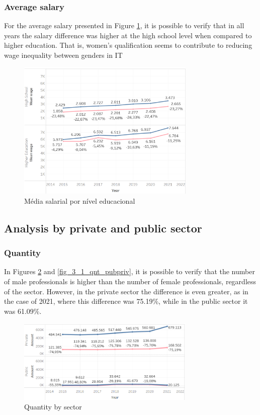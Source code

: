 \subsubsection{Average salary}

For the average salary presented in Figure \ref{fig_2_sal_educ}, it is possible to verify that in all years the salary difference was higher at the high school level when compared to higher education. That is, women’s qualification seems to contribute to reducing wage inequality between genders in IT

\begin{figure}[htbp]
	\centerline{
		\includegraphics[width=85mm]{assets/2_sal_educ.PNG}
	}
	\caption{Média salarial por nível educacional}
	\label{fig_2_sal_educ}
\end{figure}

\subsection{Analysis by private and public sector}  \label{sub:privpub}

\subsubsection{Quantity}

In Figures \ref{fig_3_qnt_pubpriv} and \ref{fig_3_1_qnt_pubpriv}, it is possible to verify that the number of male professionals is higher than the number of female professionals, regardless of the sector. However, in the private sector the difference is even greater, as in the case of 2021, where this difference was 75.19\%, while in the public sector it was 61.09\%.

\begin{figure}[htbp]
	\centerline{
		\includegraphics[width=85mm]{assets/3_qnt_pubpriv.PNG}
	}
	\caption{Quantity by sector}
	\label{fig_3_qnt_pubpriv}
\end{figure}


